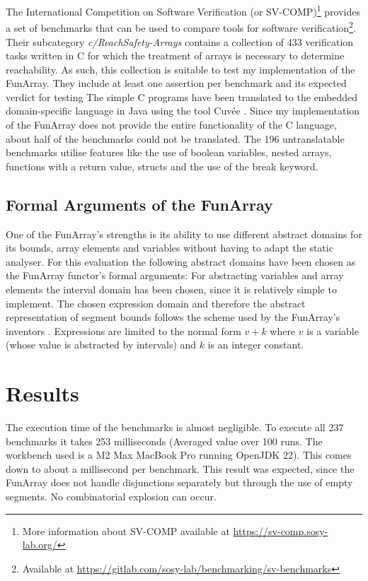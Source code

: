 \documentclass{report}
\begin{document}
The International Competition on Software Verification (or SV-COMP)\footnote{More information about SV-COMP available at \url{https://sv-comp.sosy-lab.org/}} provides a set of benchmarks that can be used to compare tools for software verification\footnote{Available at \url{https://gitlab.com/sosy-lab/benchmarking/sv-benchmarks}}. Their subcategory \textit{c/ReachSafety-Arrays} contains a collection of 433 verification tasks written in C for which the treatment of arrays is necessary to determine reachability. As such, this collection is suitable to test my implementation of the FunArray. They include at least one assertion per benchmark and its expected verdict for testing 
The simple C programs have been translated to the embedded domain-specific language in Java using the tool Cuv\'ee \cite{ernst2020}. Since my implementation of the FunArray does not provide the entire functionality of the C language, about half of the benchmarks could not be translated. The 196 untranslatable benchmarks utilise features like the use of boolean variables, nested arrays, functions with a return value, structs and the use of the break keyword.

\subsection{Formal Arguments of the FunArray}

One of the FunArray's strengths is its ability to use different abstract domains for its bounds, array elements and variables without having to adapt the static analyser. For this evaluation the following abstract domains have been chosen as the FunArray functor's formal arguments: For abstracting variables and array elements the interval domain has been chosen, since it is relatively simple to implement. The chosen expression domain and therefore the abstract representation of segment bounds follows the scheme used by the FunArray's inventors \cite[section 7.2]{cousot2011}. Expressions are limited to the normal form $v+k$ where $v$ is a variable (whose value is abstracted by intervals) and $k$ is an integer constant.

\section{Results}

The execution time of the benchmarks is almost negligible. To execute all 237 benchmarks it takes 253 milliseconds (Averaged value over 100 runs. The workbench used is a M2 Max MacBook Pro running OpenJDK 22). This comes down to about a millisecond per benchmark. This result was expected, since the FunArray does not handle disjunctions separately but through the use of empty segments. No combinatorial explosion can occur.
\end{document}
